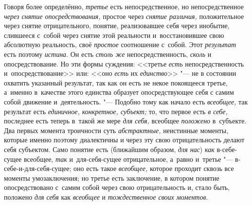 Говоря более определённо, {\em третье} есть
непосредственное, но непосредственное
{\em через снятие опосредствования,} простое через {\em снятие
различия,} положительное через снятие отрицательного,
понятие, реализовавшее себя через инобытие, слившееся с~собой через снятие
этой реальности и~восстановившее свою абсолютную реальность, своё
{\em простое} соотношение с~собой. Этот {\em результат} есть поэтому
{\em истина}. Он есть {\em столь же} непосредственность, {\em сколь} и
опосредствование. Но эти формы суждения: <<третье {\em есть}
непосредственность и~опосредствование>> или: <<оно {\em есть} их
{\em единство}>> "--- не в
состоянии охватить указанный результат, так как он есть не некое покоящееся
третье, а~именно в~качестве этого единства образует опосредствующее себя с
самим собой движение и~деятельность. "--- Подобно тому как
начало есть {\em всеобщее,} так результат есть
{\em единичное, конкретное, субъект;} то, что первое есть {\em в
себе,} последнее есть теперь в~такой же мере {\em для себя,} всеобщее
{\em положено} в~субъекте. Два первых момента троичности суть
{\em абстрактные,} неистинные моменты, которые именно поэтому диалектичны и
через эту свою отрицательность делают себя субъектом. Само понятие есть
(ближайшим образом, {\em для нас}) {\em как} в-себе-сущее
всеобщее, {\em так} и~для-себя-сущее отрицательное, а~равно и~третье
"--- в-себе-и-для-себя-сущее; оно есть такое {\em всеобщее,} которое
проходит сквозь все моменты умозаключения; но третье есть заключение, в
котором понятие опосредствовано с~самим собой через свою отрицательность и,
стало быть, положено {\em для себя} как {\em всеобщее}
и {\em тождественное своих моментов}.

